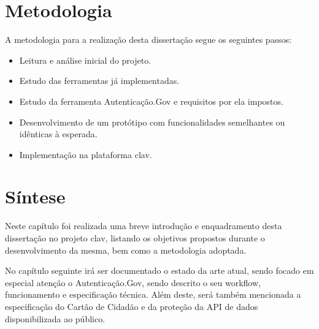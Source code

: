 \cleardoublepage
\section{Metodologia}

A metodologia para a realização desta dissertação segue os seguintes passos:

\begin{itemize}
    \item Leitura e análise inicial do projeto.
    \item Estudo das ferramentas já implementadas.
    \item Estudo da ferramenta Autenticação.Gov e requisitos por ela impostos.
    \item Desenvolvimento de um protótipo com funcionalidades semelhantes ou idênticas à esperada.
    \item Implementação na plataforma \gls{clav}.
\end{itemize}

\section{Síntese}

Neste capítulo foi realizada uma breve introdução e enquadramento desta dissertação no projeto \gls{clav}, listando os objetivos propostos durante o desenvolvimento da mesma, bem como a metodologia adoptada.

No capítulo seguinte irá ser documentado o estado da arte atual, sendo focado em especial atenção o Autenticação.Gov, sendo descrito o seu workflow, funcionamento e especificação técnica. Além deste, será também mencionada a especificação do Cartão de Cidadão e da proteção da API de dados disponibilizada ao público.